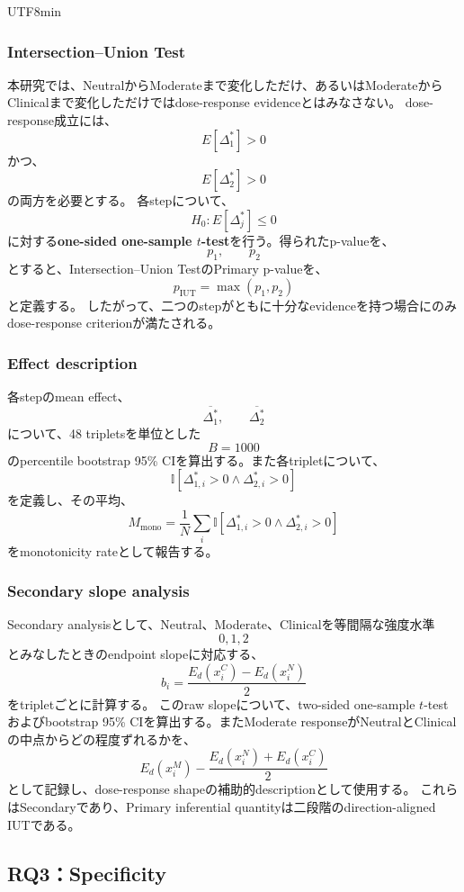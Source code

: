 \documentclass{article} %
\begin{document}
\begin{CJK*}{UTF8}{min}
\subsubsection{Intersection--Union Test}

本研究では、NeutralからModerateまで変化しただけ、あるいはModerateからClinicalまで変化しただけではdose-response evidenceとはみなさない。
dose-response成立には、
\[
E[\Delta_1^{*}]>0
\]
かつ、
\[
E[\Delta_2^{*}]>0
\]
の両方を必要とする。
各stepについて、
\[
H_0:
E[\Delta_j^{*}]\le0
\]
に対する\textbf{one-sided one-sample \(t\)-test}を行う。得られたp-valueを、
\[
p_1,
\qquad
p_2
\]
とすると、Intersection--Union TestのPrimary p-valueを、
\[
p_{\mathrm{IUT}}
=
\max(p_1,p_2)
\]
と定義する。
したがって、二つのstepがともに十分なevidenceを持つ場合にのみdose-response criterionが満たされる。


\subsubsection{Effect description}

各stepのmean effect、
\[
\overline{\Delta_1^{*}},
\qquad
\overline{\Delta_2^{*}}
\]
について、48 tripletsを単位とした
\[
B=1000
\]
のpercentile bootstrap 95\% CIを算出する。また各tripletについて、
\[
\mathbb{I}
[
\Delta_{1,i}^{*}>0
\land
\Delta_{2,i}^{*}>0
]
\]
を定義し、その平均、
\[
M_{\mathrm{mono}}
=
\frac{1}{N}
\sum_i
\mathbb{I}
[
\Delta_{1,i}^{*}>0
\land
\Delta_{2,i}^{*}>0
]
\]
をmonotonicity rateとして報告する。


\subsubsection{Secondary slope analysis}

Secondary analysisとして、Neutral、Moderate、Clinicalを等間隔な強度水準
\[
0,1,2
\]
とみなしたときのendpoint slopeに対応する、
\[
b_i
=
\frac{
E_d(x_i^{C})
-
E_d(x_i^{N})
}{2}
\]
をtripletごとに計算する。
このraw slopeについて、two-sided one-sample \(t\)-testおよびbootstrap 95\% CIを算出する。またModerate responseがNeutralとClinicalの中点からどの程度ずれるかを、
\[
E_d(x_i^{M})
-
\frac{
E_d(x_i^{N})
+
E_d(x_i^{C})
}{2}
\]
として記録し、dose-response shapeの補助的descriptionとして使用する。
これらはSecondaryであり、Primary inferential quantityは二段階のdirection-aligned IUTである。


\subsection{RQ3：Specificity}
\label{app:behavioral-rq3}


\end{CJK*}
\end{document}
